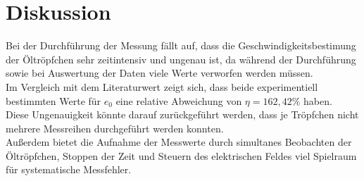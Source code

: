 \section{Diskussion}
\label{sec:Diskussion}


Bei der Durchführung der Messung fällt auf, dass die 
Geschwindigkeitsbestimung der Öltröpfchen sehr zeitintensiv und 
ungenau ist, da während der Durchführung sowie bei Auswertung der Daten viele Werte verworfen werden müssen. \\
Im Vergleich mit dem Literaturwert zeigt sich, dass beide experimentiell bestimmten Werte für $e_0$ eine 
relative Abweichung von $\eta = 162,42 \%$ haben. \\
Diese Ungenauigkeit könnte darauf zurückgeführt werden, dass je Tröpfchen nicht mehrere Messreihen durchgeführt werden 
konnten. \\ 
Außerdem bietet die Aufnahme der Messwerte durch simultanes Beobachten der Öltröpfchen, Stoppen der Zeit und Steuern des 
elektrischen Feldes viel Spielraum für systematische Messfehler. \\